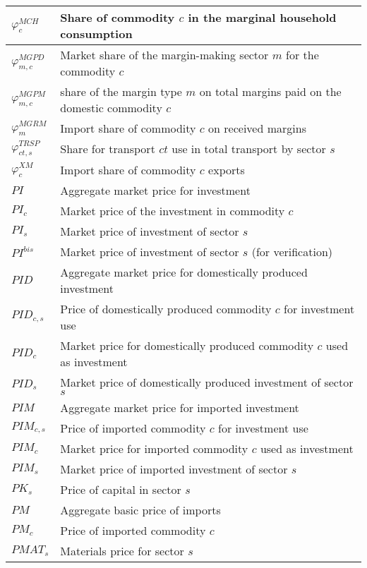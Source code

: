 \documentclass[12pt]{article}
\numberwithin{equation}{section}
\begin{document}
\begin{longtable}{@{}p{4cm}p{9cm}@{}}
 \midrule 
$\varphi^{MCH}_{c}$ & Share of commodity $c$ in the marginal household consumption \\
 \midrule 
$\varphi^{MGPD}_{m, c}$ & Market share of the margin-making sector $m$  for the commodity $c$ \\
 \midrule 
$\varphi^{MGPM}_{m, c}$ &  share of the margin type $m$ on total margins paid on the domestic commodity $c$ \\
 \midrule 
$\varphi^{MGRM}_{m}$ & Import share of commodity $c$ on received margins \\
 \midrule 
$\varphi^{TRSP}_{ct, s}$ & Share for transport $ct$ use in total transport by sector $s$ \\
 \midrule 
$\varphi^{XM}_{c}$ & Import share of commodity $c$ exports \\
 \midrule 
$PI$ & Aggregate market price for investment \\
 \midrule 
$PI_{c}$ & Market price of the investment in commodity $c$ \\
 \midrule 
$PI_{s}$ & Market price of investment of sector $s$ \\
 \midrule 
$PI^{bis}$ & Market price of investment of sector $s$ (for verification) \\
 \midrule 
$PID$ & Aggregate market price for domestically produced investment \\
 \midrule 
$PID_{c, s}$ & Price of domestically produced commodity $c$ for investment use \\
 \midrule 
$PID_{c}$ & Market price for domestically produced commodity $c$ used as investment \\
 \midrule 
$PID_{s}$ & Market price of domestically produced investment of sector $s$ \\
 \midrule 
$PIM$ & Aggregate market price for imported investment \\
 \midrule 
$PIM_{c, s}$ & Price of imported commodity $c$ for investment use \\
 \midrule 
$PIM_{c}$ & Market price for imported commodity $c$ used as investment \\
 \midrule 
$PIM_{s}$ & Market price of imported investment of sector $s$ \\
 \midrule 
$PK_{s}$ & Price of capital in sector $s$ \\
 \midrule 
$PM$ & Aggregate basic price of imports \\
 \midrule 
$PM_{c}$ & Price of imported commodity $c$ \\
 \midrule 
$PMAT_{s}$ & Materials price for sector $s$ \\

\end{longtable}
\end{document}

